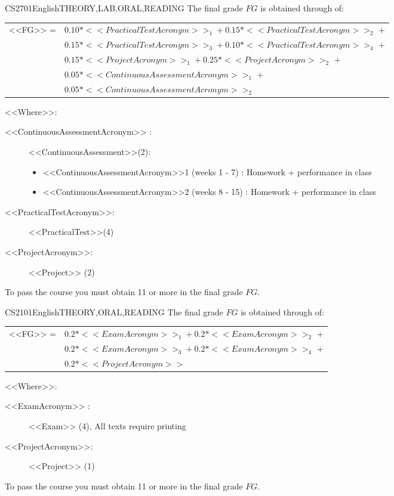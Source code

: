     
    \begin{evaluation}{CS2701}{English}{THEORY,LAB,ORAL,READING}
    The final grade $FG$ is obtained through of:
    
    \begin{tabular}{cl}
        <<FG>> =  & $0.10*<<PracticalTestAcronym>>_{1} + 0.15*<<PracticalTestAcronym>>_{2}$ + \\
                  & $0.15*<<PracticalTestAcronym>>_{3} + 0.10*<<PracticalTestAcronym>>_{4}$ +\\ 
                  & $0.15*<<ProjectAcronym>>_{1} + 0.25*<<ProjectAcronym>>_{2}$ + \\
                  & $0.05 *<<ContinuousAssessmentAcronym>>_{1}$ + \\
                  & $0.05 *<<ContinuousAssessmentAcronym>>_{2}$ 
      \end{tabular}
    
    \noindent <<Where>>:
    \begin{description}
        \item[<<ContinuousAssessmentAcronym>> :] <<ContinuousAssessment>>(2):
       \begin{itemize}
               \item  <<ContinuousAssessmentAcronym>>1 (weeks 1 - 7) : Homework + performance in class
                \item <<ContinuousAssessmentAcronym>>2 (weeks 8 - 15) :  Homework + performance in class
         \end{itemize}
        \item[<<PracticalTestAcronym>>:] <<PracticalTest>>(4)
        \item[<<ProjectAcronym>>:] <<Project>> (2)    
    \end{description}
    \noindent To pass the course you must obtain 11 or more in the final grade $FG$.
    \end{evaluation}
    
    
    
    \begin{evaluation}{CS2101}{English}{THEORY,ORAL,READING}
    The final grade $FG$ is obtained through of:
    
    \begin{tabular}{cl}
        <<FG>> =  & $0.2* <<ExamAcronym>>_{1} + 0.2* <<ExamAcronym>>_{2}$ + \\
                  & $0.2*<<ExamAcronym>>_{3} + 0.2*<<ExamAcronym>>_{4}$ + \\
                  & $0.2*<<ProjectAcronym>>$
    \end{tabular}

    \noindent <<Where>>:
    \begin{description}
        \item[<<ExamAcronym>> :] <<Exam>> (4), All texts require printing
        \item[<<ProjectAcronym>>:] <<Project>> (1)
    \end{description}
    \noindent To pass the course you must obtain 11 or more in the final grade $FG$.
    \end{evaluation}
    
